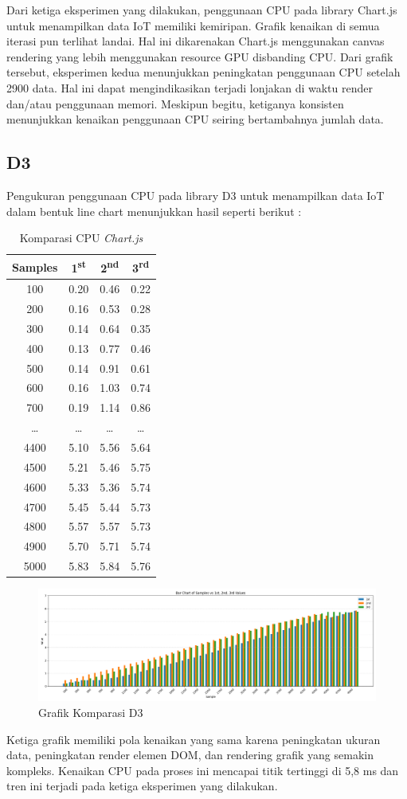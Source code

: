 Dari ketiga eksperimen yang dilakukan, penggunaan CPU pada library Chart.js untuk menampilkan data IoT memiliki kemiripan. Grafik kenaikan di semua iterasi pun terlihat landai. Hal ini dikarenakan Chart.js menggunakan canvas rendering yang lebih menggunakan resource GPU disbanding CPU.
Dari grafik tersebut, eksperimen kedua menunjukkan peningkatan penggunaan CPU setelah 2900 data. Hal ini dapat mengindikasikan terjadi lonjakan di waktu render dan/atau penggunaan memori. Meskipun begitu, ketiganya konsisten menunjukkan kenaikan penggunaan CPU seiring bertambahnya jumlah data.

\subsection{D3}
Pengukuran penggunaan CPU pada library D3 untuk menampilkan data IoT dalam bentuk line chart menunjukkan hasil seperti berikut : 
\begin{longtable}{|c|c|c|c|}
	\caption{Komparasi CPU \textit{Chart.js}} \\
	\hline
	\textbf{Samples} & \textbf{1\textsuperscript{st}} & \textbf{2\textsuperscript{nd}} & \textbf{3\textsuperscript{rd}} \\
	\hline
	\endfirsthead
	\hline
100  & 0.20 & 0.46 & 0.22 \\
200  & 0.16 & 0.53 & 0.28 \\
300  & 0.14 & 0.64 & 0.35 \\
400  & 0.13 & 0.77 & 0.46 \\
500  & 0.14 & 0.91 & 0.61 \\
600  & 0.16 & 1.03 & 0.74 \\
700  & 0.19 & 1.14 & 0.86 \\
\ldots & \ldots & \ldots & \ldots \\
4400 & 5.10 & 5.56 & 5.64 \\
4500 & 5.21 & 5.46 & 5.75 \\
4600 & 5.33 & 5.36 & 5.74 \\
4700 & 5.45 & 5.44 & 5.73 \\
4800 & 5.57 & 5.57 & 5.73 \\
4900 & 5.70 & 5.71 & 5.74 \\
5000 & 5.83 & 5.84 & 5.76 \\
	\hline
\end{longtable}

	\begin{figure}[H]
	\centering
	\includegraphics[width=0.8\linewidth]{gambar/Pembahasan/FIX_CPU/d3_compare.png}
	\caption{Grafik Komparasi D3}
	\label{Grafik Komparasi D3}
\end{figure}
Ketiga grafik memiliki pola kenaikan yang sama karena peningkatan ukuran data, peningkatan render elemen DOM, dan rendering grafik yang semakin kompleks. Kenaikan CPU pada proses ini mencapai titik tertinggi di 5,8 ms dan tren ini terjadi pada ketiga eksperimen yang dilakukan. 

